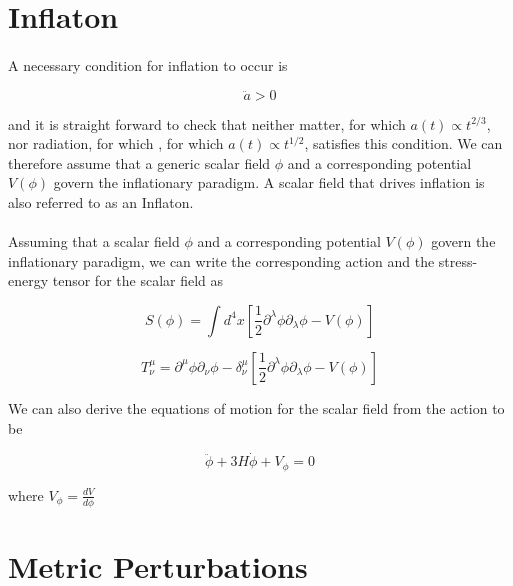 \documentclass[12pt,a4paper,oneside]{book}
\begin{document}
\section{Inflaton}

\paragraph*{} A necessary condition for inflation to occur is

\begin{equation}
\ddot{a} > 0
\end{equation}

\noindent and it is straight forward to check that neither matter, for which $a(t) \propto t^{2/3}$, nor radiation, for which , for which $a(t) \propto t^{1/2}$, 
satisfies this condition. We can therefore assume that a generic scalar field $\phi$ and a corresponding potential $V(\phi)$ govern the inflationary 
paradigm. A scalar field that drives inflation is also referred to as an Inflaton.

\paragraph*{} Assuming that a scalar field $\phi$ and a corresponding potential $V(\phi)$ govern the inflationary paradigm, we can write the corresponding action and the stress-energy tensor for the scalar field as

\begin{equation}
S(\phi) = \int d^4x[\frac{1}{2}\partial^{\lambda}\phi \partial_{\lambda}\phi - V(\phi)]
\end{equation}

\begin{equation}
T^{\mu}_{\nu} = \partial^{\mu}\phi \partial_{\nu}\phi -\delta^{\mu}_{\nu}[\frac{1}{2}\partial^{\lambda}\phi \partial_{\lambda}\phi - V(\phi)]
\end{equation}

\noindent We can also derive the equations of motion for the scalar field from the action to be

\begin{equation}
\ddot{\phi} + 3H\dot{\phi} + V_{\phi} = 0
\end{equation}

\noindent where $V_{\phi} = \frac{dV}{d\phi}$

\section{Metric Perturbations}
\end{document}
